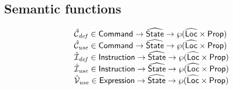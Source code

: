 \subsection{Semantic functions}
\[
\begin{array}{l}
	\aN_{\it def} \in \Command \rightarrow \aState \rightarrow \powerset{\aLoc\times \SF{Prop}}\\
	\aN_{\it use} \in \Command \rightarrow \aState \rightarrow \powerset{\aLoc\times \SF{Prop}}\\
	\aI_{\it def} \in \SF{Instruction} \rightarrow \aState \rightarrow \powerset{\aLoc\times \SF{Prop}}\\
	\aI_{\it use} \in \SF{Instruction} \rightarrow \aState \rightarrow \powerset{\aLoc\times \SF{Prop}}\\
	\aV_{\it use} \in \SF{Expression} \rightarrow \aState \rightarrow \powerset{\aLoc\times \SF{Prop}}\\
\end{array}
\]
\\

